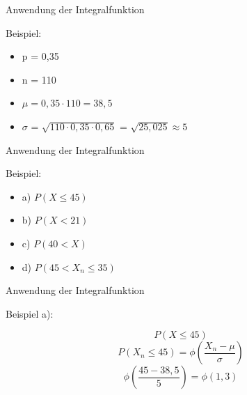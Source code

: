 \documentclass[14pt]{beamer}
\begin{document}
\begin{frame} {Anwendung der Integralfunktion}

Beispiel:
\begin{itemize}
 \item p = 0,35
 \item n = 110
 \item $\mu = 0,35 \cdot 110 = 38,5 $
 \item $\sigma$ = $\sqrt{110 \cdot 0,35 \cdot 0,65}$ = $\sqrt{25,025} \approx 5$ 
\end{itemize}

\end{frame}

\begin{frame} {Anwendung der Integralfunktion}

Beispiel:
\begin{itemize}
 \item a) $P(X \le 45)$
 \item b) $P(X < 21)$
 \item c) $P(40 < X)$
 \item d) $P(45 < X_n \le 35)$
\end{itemize}

\end{frame}

\begin{frame} {Anwendung der Integralfunktion}

Beispiel a):
 
 $$P(X\le45)$$
 $$P(X_n \le 45) =  \phi\left(\frac{X_n - \mu}{\sigma}\right)$$
 $$ \phi(\frac{45 - 38,5}{5}) = \phi(1,3) $$

\end{frame}
\end{document}

